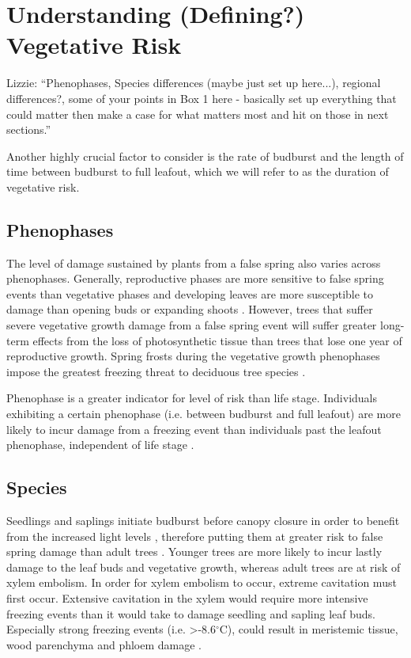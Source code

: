 \documentclass{article}\usepackage[]{graphicx}\usepackage[]{color}
\begin{document}
\section*{Understanding (Defining?) Vegetative Risk}
Lizzie: ``Phenophases, Species differences (maybe just set up here...), regional differences?, some of your points in Box 1 here - basically set up everything that could matter then make a case for what matters most and hit on those in next sections.''

Another highly crucial factor to consider is the rate of budburst and the length of time between budburst to full leafout, which we will refer to as the duration of vegetative risk.

\subsection*{Phenophases}
The level of damage sustained by plants from a false spring also varies across phenophases. Generally, reproductive phases are more sensitive to false spring events than vegetative phases and developing leaves are more susceptible to damage than opening buds or expanding shoots \citep{Lenz2013,Augspurger2009}. However, trees that suffer severe vegetative growth damage from a false spring event will suffer greater long-term effects from the loss of photosynthetic tissue than trees that lose one year of reproductive growth. Spring frosts during the vegetative growth phenophases impose the greatest freezing threat to deciduous tree species \citep{Sakai1987}.

Phenophase is a greater indicator for level of risk than life stage. Individuals exhibiting a certain phenophase (i.e. between budburst and full leafout) are more likely to incur damage from a freezing event than individuals past the leafout phenophase, independent of life stage \citep{Augspurger2009,Vitasse2014}.

\subsection*{Species}
Seedlings and saplings initiate budburst before canopy closure in order to benefit from the increased light levels \citep{Augspurger2008}, therefore putting them at greater risk to false spring damage than adult trees \citep{Vitasse2014}. Younger trees are more likely to incur lastly damage to the leaf buds and vegetative growth, whereas adult trees are at risk of xylem embolism. In order for xylem embolism to occur, extreme cavitation must first occur. Extensive cavitation in the xylem would require more intensive freezing events than it would take to damage seedling and sapling leaf buds. Especially strong freezing events (i.e. >-8.6$^{\circ}$C), could result in meristemic tissue, wood parenchyma and phloem damage \citep{Lenz2013, Augspurger2011, Sakai1987}.  
\end{document}
